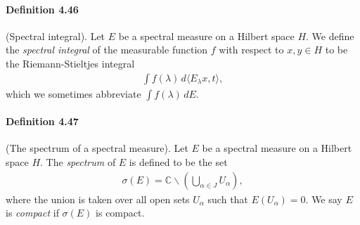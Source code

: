 \documentclass{article}
\begin{document}
\paragraph{Definition 4.46\label{def:4.46}} (Spectral integral). Let $E$ be a spectral measure on a Hilbert space $H$. We define the \textit{spectral integral} of the measurable function $f$ with respect to $x,y\in H$ to be the Riemann-Stieltjes integral
\begin{align*}
	\int f(\lambda)\,d\langle E_\lambda x,t\rangle,
\end{align*}
which we sometimes abbreviate $\int f(\lambda)\,dE$.

\paragraph{Definition 4.47\label{def:4.47}} (The spectrum of a spectral measure). Let $E$ be a spectral measure on a Hilbert space $H$. The \textit{spectrum} of $E$ is defined to be the set
\begin{align*}
	\sigma(E)=\mathbb{C}\backslash\left(\bigcup_{\alpha\in J} U_\alpha\right),
\end{align*}
where the union is taken over all open sets $U_\alpha$ such that $E(U_\alpha)=0$. We say $E$ is \textit{compact} if $\sigma(E)$ is compact.
\end{document}
